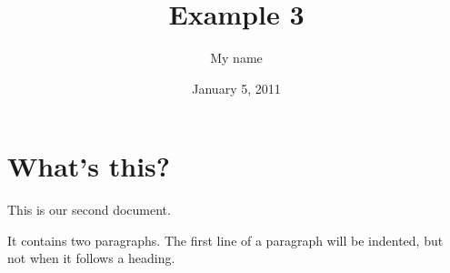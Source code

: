 \documentclass[a4paper,11pt]{article}
\begin{document}
\title{Example 3}
\author{My name}
\date{January 5, 2011}
\maketitle
\section{What's this?}
This        is   our
second document.

It contains two paragraphs. The first line of a paragraph will be
indented, but not when it follows a heading.
\end{document}

